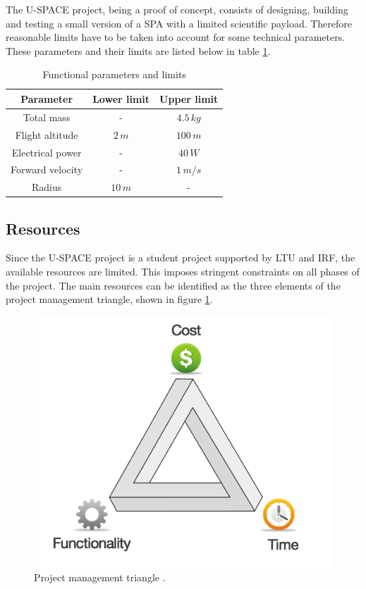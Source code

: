 The \ac{U-SPACE} project, being a proof of concept, consists of designing, building and testing a small version of a \ac{SPA} with a limited scientific payload. Therefore reasonable limits have to be taken into account for some technical parameters. These parameters and their limits are listed below in table \ref{tab:functionality}.

\begin{table}[H]
\centering
\caption{Functional parameters and limits}
\label{tab:functionality}
\begin{tabular}{c c c}
\hline
\textbf{Parameter} & \textbf{Lower limit} & \textbf{Upper limit}\\ \hline
Total mass & - & $4.5\,kg$\\
Flight altitude & $2\,m$ & $100\,m$\\
Electrical power & - & $40\,W$\\
Forward velocity & - & $1\,m/s$\\
Radius & $10\,m$ & -\\
\hline
\end{tabular}
\end{table}

\subsection{Resources}

Since the \ac{U-SPACE} project is a student project supported by \ac{LTU} and \ac{IRF}, the available resources are limited. This imposes stringent constraints on all phases of the project. The main resources can be identified as the three elements of the project management triangle, shown in figure \ref{fig:project_triangle}.

\begin{figure}[htbp!]
\centering
\includegraphics[scale=0.2]{figures/project_triangle.png}
\caption[Project management triangle]{Project management triangle \cite{website:claromentis}.}
\label{fig:project_triangle}
\end{figure}

